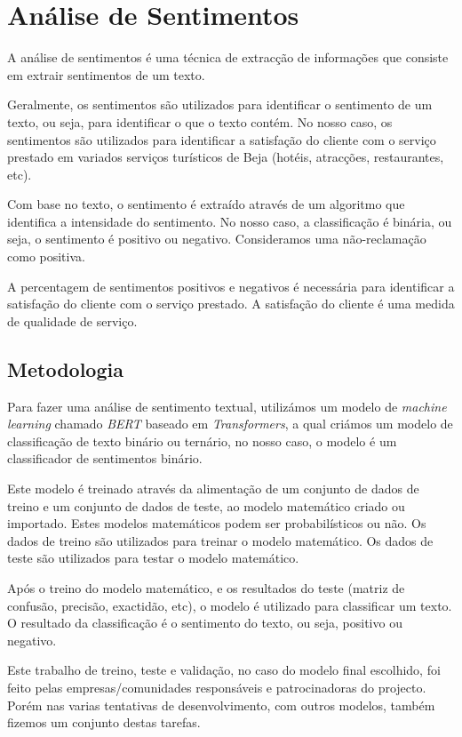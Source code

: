 \section{Análise de Sentimentos}

A análise de sentimentos é uma técnica de extracção de informações que consiste em extrair sentimentos de um texto.

Geralmente, os sentimentos são utilizados para identificar o sentimento de um texto, ou seja, para identificar o que o texto contém. No nosso caso, os sentimentos são utilizados para identificar a satisfação do cliente com o serviço prestado em variados serviços turísticos de Beja (hotéis, atracções, restaurantes, etc).

Com base no texto, o sentimento é extraído através de um algoritmo que identifica a intensidade do sentimento. No nosso caso, a classificação é binária, ou seja, o sentimento é positivo ou negativo. Consideramos uma não-reclamação como positiva.

A percentagem de sentimentos positivos e negativos é necessária para identificar a satisfação do cliente com o serviço prestado. A satisfação do cliente é uma medida de qualidade de serviço.

\subsection{Metodologia}

Para fazer uma análise de sentimento textual, utilizámos um modelo de \textit{machine learning} chamado \textit{BERT} baseado em \textit{Transformers}, a qual criámos um modelo de classificação de texto binário ou ternário, no nosso caso, o modelo é um classificador de sentimentos binário.

Este modelo é treinado através da alimentação de um conjunto de dados de treino e um conjunto de dados de teste, ao modelo matemático criado ou importado. Estes modelos matemáticos podem ser probabilísticos ou não. Os dados de treino são utilizados para treinar o modelo matemático. Os dados de teste são utilizados para testar o modelo matemático.

Após o treino do modelo matemático, e os resultados do teste (matriz de confusão, precisão, exactidão, etc), o modelo é utilizado para classificar um texto. O resultado da classificação é o sentimento do texto, ou seja, positivo ou negativo.

Este trabalho de treino, teste e validação, no caso do modelo final escolhido, foi feito pelas empresas/comunidades responsáveis e patrocinadoras do projecto. Porém nas varias tentativas de desenvolvimento, com outros modelos, também fizemos um conjunto destas tarefas.

